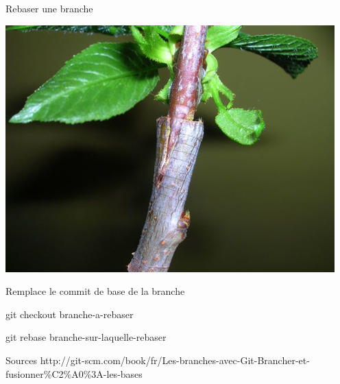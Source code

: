 \begin{frame}{Rebaser une branche}
\begin{center}
\includegraphics[scale=0.4]{greffe-00c1e2a50.jpg}

Remplace le commit de base de la branche

git checkout branche-a-rebaser

git rebase branche-sur-laquelle-rebaser
\end{center}
\end{frame}

\begin{frame}{Sources}
http://git-scm.com/book/fr/Les-branches-avec-Git-Brancher-et-fusionner\%C2\%A0\%3A-les-bases
\end{frame}
